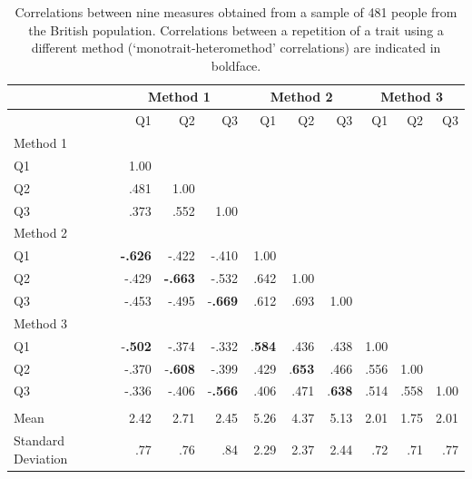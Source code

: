 \documentclass[a4paper,12pt]{article}
\begin{document}
\begin{table}\centering\caption{Correlations between nine measures obtained from a sample of 481 people from the British population. Correlations between a repetition of a trait using a different method (`monotrait-heteromethod' correlations) are indicated in boldface.\label{tab:mtmm_cor}}
\begin{tabular}{lrrrrrrrrr}\hline
& \multicolumn{3}{c}{Method 1} & \multicolumn{3}{c}{Method 2} & \multicolumn{3}{c}{Method  3} \\ 
\hline
& Q1 & Q2 & Q3 & Q1 & Q2 & Q3 & Q1 & Q2 & Q3 \\ 
Method 1\\ 
Q1 & 1.00 \\ 
Q2 & .481 & 1.00 &  \\ 
Q3 & .373 & .552 & 1.00 \\ 
Method 2\\ 
Q1 & \textbf{-.626} & -.422 & -.410 & 1.00 \\ 
Q2 & -.429 & \textbf{-.663} & -.532 & .642 & 1.00 \\ 
Q3 & -.453 & -.495 & -\textbf{.669} & .612 & .693 & 1.00 \\ 
Method 3\\
Q1 & -\textbf{.502} & -.374 & -.332 & .\textbf{584} & .436 & .438 & 1.00 \\ 
Q2 & -.370 & -\textbf{.608} & -.399 & .429 & .\textbf{653} & .466 & .556 & 1.00 \\ 
Q3 & -.336 & -.406 & -\textbf{.566} & .406 & .471 & .\textbf{638} & .514 & .558 & 1.00 \\ 
 \\ 
Mean & 2.42 & 2.71 & 2.45 & 5.26 & 4.37 & 5.13 & 2.01 & 1.75 & 2.01 \\ 
Standard Deviation & .77 & .76 & .84 & 2.29 & 2.37 & 2.44 & .72 & .71 & .77 \\ 
\hline
\end{tabular}

\end{table}
\end{document}
